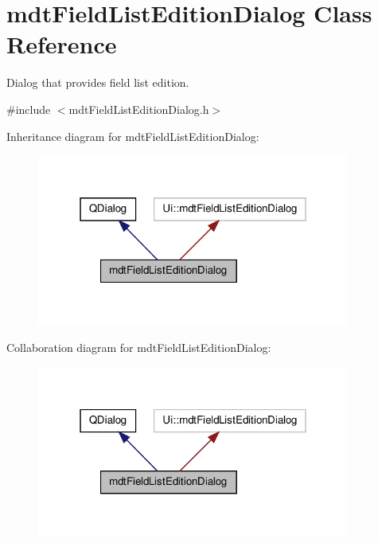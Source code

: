 \hypertarget{classmdt_field_list_edition_dialog}{\section{mdt\-Field\-List\-Edition\-Dialog Class Reference}
\label{classmdt_field_list_edition_dialog}
}


Dialog that provides field list edition.  




{\ttfamily \#include $<$mdt\-Field\-List\-Edition\-Dialog.\-h$>$}



Inheritance diagram for mdt\-Field\-List\-Edition\-Dialog\-:\nopagebreak
\begin{figure}[H]
\begin{center}
\leavevmode
\includegraphics[width=292pt]{classmdt_field_list_edition_dialog__inherit__graph}
\end{center}
\end{figure}


Collaboration diagram for mdt\-Field\-List\-Edition\-Dialog\-:\nopagebreak
\begin{figure}[H]
\begin{center}
\leavevmode
\includegraphics[width=292pt]{classmdt_field_list_edition_dialog__coll__graph}
\end{center}
\end{figure}
